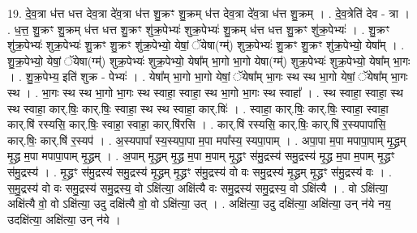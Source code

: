 \documentclass[17pt]{extarticle}
\begin{document}
19. दे॒व॒त्रा ध॑त्त धत्त देव॒त्रा दे॑व॒त्रा ध॑त्त शु॒क्रꣳ शु॒क्रम् ध॑त्त देव॒त्रा दे॑व॒त्रा ध॑त्त शु॒क्रम् । . दे॒व॒त्रेति॑ देव - त्रा । . ध॒त्त॒ शु॒क्रꣳ शु॒क्रम् ध॑त्त धत्त शु॒क्रꣳ शु॑क्र॒पेभ्यः॑ शुक्र॒पेभ्यः॑ शु॒क्रम् ध॑त्त धत्त शु॒क्रꣳ शु॑क्र॒पेभ्यः॑ । . शु॒क्रꣳ शु॑क्र॒पेभ्यः॑ शुक्र॒पेभ्यः॑ शु॒क्रꣳ शु॒क्रꣳ शु॑क्र॒पेभ्यो॒ येषां॒ ॅयेषा(ग्म्॑) शुक्र॒पेभ्यः॑ शु॒क्रꣳ शु॒क्रꣳ शु॑क्र॒पेभ्यो॒ येषा᳚म् । . शु॒क्र॒पेभ्यो॒ येषां॒ ॅयेषा(ग्म्॑) शुक्र॒पेभ्यः॑ शुक्र॒पेभ्यो॒ येषा᳚म् भा॒गो भा॒गो येषा(ग्म्॑) शुक्र॒पेभ्यः॑ शुक्र॒पेभ्यो॒ येषा᳚म् भा॒गः । . शु॒क्र॒पेभ्य॒ इति॑ शुक्र - पेभ्यः॑ । . येषा᳚म् भा॒गो भा॒गो येषां॒ ॅयेषा᳚म् भा॒गः स्थ स्थ भा॒गो येषां॒ ॅयेषा᳚म् भा॒गः स्थ । . भा॒गः स्थ स्थ भा॒गो भा॒गः स्थ स्वाहा॒ स्वाहा॒ स्थ भा॒गो भा॒गः स्थ स्वाहा᳚ । . स्थ स्वाहा॒ स्वाहा॒ स्थ स्थ स्वाहा॒ कार्.षिः॒ कार्.षिः॒ स्वाहा॒ स्थ स्थ स्वाहा॒ कार्.षिः॑ । . स्वाहा॒ कार्.षिः॒ कार्.षिः॒ स्वाहा॒ स्वाहा॒ कार्.षि॑ रस्यसि॒ कार्.षिः॒ स्वाहा॒ स्वाहा॒ कार्.षि॑रसि । . कार्.षि॑ रस्यसि॒ कार्.षिः॒ कार्.षि॑ र॒स्यपापा॑सि॒ कार्.षिः॒ कार्.षि॑ र॒स्यप॑ । . अ॒स्यपापा᳚ स्य॒स्यपा॒पा म॒पा मपा᳚स्य॒ स्यपा॒पाम् । . अपा॒पा म॒पा मपापा॒पाम् मृ॒द्ध्रम् मृ॒द्ध्र म॒पा मपापा॒पाम् मृ॒द्ध्रम् । . अ॒पाम् मृ॒द्ध्रम् मृ॒द्ध्र म॒पा म॒पाम् मृ॒द्ध्रꣳ स॑मु॒द्रस्य॑ समु॒द्रस्य॑ मृ॒द्ध्र म॒पा म॒पाम् मृ॒द्ध्रꣳ स॑मु॒द्रस्य॑ । . मृ॒द्ध्रꣳ स॑मु॒द्रस्य॑ समु॒द्रस्य॑ मृ॒द्ध्रम् मृ॒द्ध्रꣳ स॑मु॒द्रस्य॑ वो वः समु॒द्रस्य॑ मृ॒द्ध्रम् मृ॒द्ध्रꣳ स॑मु॒द्रस्य॑ वः । . स॒मु॒द्रस्य॑ वो वः समु॒द्रस्य॑ समु॒द्रस्य॒ वो ऽक्षि॑त्या॒ अक्षि॑त्यै वः समु॒द्रस्य॑ समु॒द्रस्य॒ वो ऽक्षि॑त्यै । . वो ऽक्षि॑त्या॒ अक्षि॑त्यै वो॒ वो ऽक्षि॑त्या॒ उदु दक्षि॑त्यै वो॒ वो ऽक्षि॑त्या॒ उत् । . अक्षि॑त्या॒ उदु दक्षि॑त्या॒ अक्षि॑त्या॒ उन् न॑ये नय॒ उदक्षि॑त्या॒ अक्षि॑त्या॒ उन् न॑ये । \newline
\end{document}

